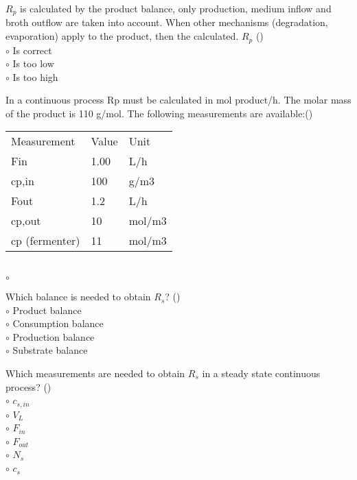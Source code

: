 \documentclass[]{beamer}
\begin{document}
\begin{frame}[shrink] {}
\addtocounter{questions}{1}
\color{blue}
$R_p$ is calculated by the product balance, only production, medium inflow and broth outflow are taken into account.
When other mechanisms (degradation, evaporation) apply to the product, then the calculated. $R_p$ ()\\
\color{black}
\setlength{\parindent}{-0.4cm}
{\color{red}$\circ$} Is correct\\
{\color{red}$\circ$} Is too low \\
{\color{red}$\circ$} Is too high \\
\end{frame}

\begin{frame}[shrink] {}
\addtocounter{questions}{1}
\color{blue}
In a continuous process Rp must be calculated in mol product/h. The molar mass of the product is 110 g/mol. The following measurements are available:({})\\[0.3em]
\color{gray}
\begin{tabular}[]{l l l}
Measurement & Value & Unit\\
Fin & 1.00 & L/h\\
cp,in& 	100& 	g/m3\\
Fout& 	1.2& 	L/h\\
cp,out&  	10 & 	mol/m3\\
cp (fermenter) & 11 & 	mol/m3\\
\end{tabular}\\[0.3em]
\color{black}
\setlength{\parindent}{-0.4cm}
{\color{red}$\circ$} \\
 
\end{frame}

\begin{frame}[shrink] {}
\addtocounter{questions}{1}
\color{blue}
Which balance is needed to obtain $R_s$? ()\\[0.3em]
\color{black}
\setlength{\parindent}{-0.4cm}
{\color{red}$\circ$}  Product balance  \\
{\color{red}$\circ$} Consumption balance\\
{\color{red}$\circ$} Production balance \\
{\color{red}$\circ$} Substrate balance 
\end{frame}

\begin{frame}[shrink] {}
\addtocounter{questions}{1}
\color{blue}
Which measurements are needed to obtain $R_s$ in a steady state continuous process?  ()\\
\color{black}
\setlength{\parindent}{-0.4cm}
{\color{red}$\circ$}  $c_{s,in}$\\
{\color{red}$\circ$} $V_L$\\
{\color{red}$\circ$} $F_{in}$\\
{\color{red}$\circ$} $F_{out}$\\
{\color{red}$\circ$} $N_s$\\
{\color{red}$\circ$} $c_s$
\end{frame}
\end{document}
